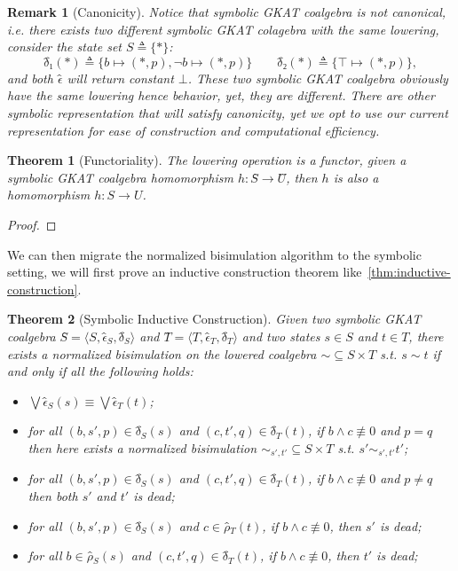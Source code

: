 \documentclass[conference]{IEEEtran}
\newtheorem{theorem}{Theorem}
\newtheorem{remark}[definition]{Remark}
\begin{document}
\begin{remark}[Canonicity]
    Notice that symbolic GKAT coalgebra is not canonical, i.e. there exists two different symbolic GKAT colagebra with the same lowering, consider the state set \(S ≜ \{*\}\):
    \[{δ̂}₁(*) ≜ \{b ↦ (*, p), ¬ b ↦ (*, p)\} \qquad 
    {δ̂}₂(*) ≜ \{⊤ ↦ (*, p)\},\] 
    and both \(ϵ̂\) will return constant \(⊥\).
    These two symbolic GKAT coalgebra obviously have the same lowering hence behavior, yet, they are different.
    There are other symbolic representation that will satisfy canonicity, yet we opt to use our current representation for ease of construction and computational efficiency.
\end{remark}

\begin{theorem}[Functoriality]
    The lowering operation is a functor, given a symbolic GKAT coalgebra homomorphism \(h: Ŝ → Û\), then \(h\) is also a homomorphism \(h: S → U\).
\end{theorem}

\begin{proof}
    
\end{proof}

We can then migrate the normalized bisimulation algorithm to the symbolic setting, we will first prove an inductive construction theorem like~\cref{thm:inductive-construction}.

\begin{theorem}[Symbolic Inductive Construction]\label{thm:symb-inductive-construction}
    Given two symbolic GKAT coalgebra \(Ŝ = ⟨S, ϵ̂_S, δ̂_S⟩\) and \(T̂ = ⟨T, ϵ̂_T, δ̂_T⟩\) and two states \(s ∈ S\) and \(t ∈ T\), there exists a normalized bisimulation on the lowered coalgebra \({∼} ⊆ S × T\) s.t. \(s ∼ t\) if and only if all the following holds:
    \begin{itemize}
        \item \(⋁ ϵ̂_S(s) ≡ ⋁ ϵ̂_T(t)\);
        \item for all \((b, s', p) ∈ δ̂_S(s)\) and \((c, t', q) ∈ δ̂_T(t)\), if \(b ∧ c ≢ 0\) and \(p = q\) then here exists a normalized bisimulation \({∼_{s',t'}} ⊆ S × T\) s.t. \(s' ∼_{s',t'} t'\);
        \item for all \((b, s', p) ∈ δ̂_S(s)\) and \((c, t', q) ∈ δ̂_T(t)\), if \(b ∧ c ≢ 0\) and \(p ≠ q\) then both \(s'\) and \(t'\) is dead;  
        \item for all \((b, s', p) ∈ δ̂_S(s)\) and \(c ∈ ρ̂_T(t)\), if \(b ∧ c ≢ 0\), then \(s'\) is dead;
        \item for all \(b ∈ ρ̂_S(s)\) and \((c, t', q) ∈ δ̂_T(t)\), if \(b ∧ c ≢ 0\), then \(t'\) is dead;
    \end{itemize}
\end{theorem}
\end{document}
